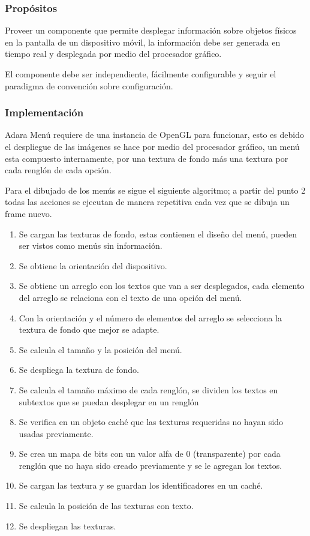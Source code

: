 \documentclass[12pt,a4paper,spanish,openany]{book}
\begin{document}
\subsubsection{Propósitos}
Proveer un componente que permite desplegar información sobre objetos físicos en
la pantalla de un dispositivo móvil, la información debe ser generada en tiempo
real y desplegada por medio del procesador gráfico.

El componente debe ser independiente, fácilmente configurable y seguir el
paradigma de convención sobre configuración.

\subsubsection{Implementación}

Adara Menú requiere de una instancia de OpenGL para funcionar, esto es debido el
despliegue de las imágenes se hace por medio del procesador gráfico, un menú
esta compuesto internamente, por una textura de fondo más una textura por cada
renglón de cada opción.

Para el dibujado de los menús se sigue el siguiente algoritmo; a partir del punto
2 todas las acciones se ejecutan de manera repetitiva cada vez que se dibuja un
frame nuevo.

\begin{enumerate}
  \item Se cargan las texturas de fondo, estas contienen el diseño del menú,
  pueden ser vistos como menús sin información.
  \item  Se obtiene la orientación del dispositivo.
  \item Se obtiene un arreglo con los textos que van a ser desplegados, cada
  elemento del arreglo se relaciona con el texto de una opción del menú.
  \item Con la orientación y el número de elementos del arreglo se selecciona la
  textura de fondo que mejor se adapte.
  \item Se calcula el tamaño y la posición del menú.
  \item Se despliega la textura de fondo.
  \item Se calcula el tamaño máximo de cada renglón, se dividen los textos en
  subtextos que se puedan desplegar en un renglón
  \item Se verifica en un objeto caché que las texturas requeridas no hayan sido
  usadas previamente.%
  \item Se crea un mapa de bits con un valor alfa de 0 (transparente) por cada
  renglón que no haya sido creado previamente y se le agregan los textos.
  \item Se cargan las textura y se guardan los identificadores en un caché.
  \item Se calcula la posición de las texturas con texto.
  \item Se despliegan las texturas.
\end{enumerate}
\end{document}
